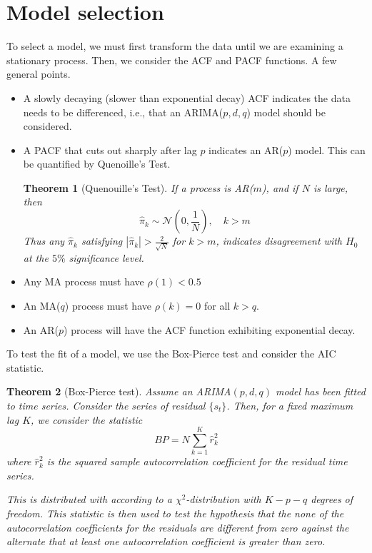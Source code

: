 \documentclass[10pt, oneside, reqno]{amsart}
\theoremstyle{plain}%
\newtheorem{thm}{Theorem}[section]
\theoremstyle{definition}
\theoremstyle{remark}
\newcommand{\ts}[1]{\{ #1 \}}
\begin{document}
\section{Model selection} %
\label{sec:model_selection}
	To select a model, we must first transform the data until we are examining a stationary process. 
	Then, we consider the ACF and PACF functions.  A few general points.
	\begin{itemize}
		\item A slowly decaying (slower than exponential decay) ACF indicates the data needs to be differenced, i.e., that an ARIMA($p,d,q$) model should be considered.
		\item A PACF that cuts out sharply after lag $p$ indicates an AR($p$) model.  This can be quantified by Quenoille's Test.  \begin{thm}[Quenouille's Test]
			If a process is AR($m$), and if $N$ is large, then \[
				\hat \pi_k \sim \mathcal{N}(0, \frac{1}{N}), \quad k > m
			\]
		Thus any $\hat \pi_k$ satisfying $|\hat \pi_k| > \frac{2}{\sqrt{N}}$ for $k > m$, indicates disagreement with $H_0$ at the $5\%$ significance level.
		\end{thm}
		\item Any MA process must have $\rho(1) < 0.5$
		\item An MA($q$) process must have $\rho(k) = 0$ for all $k > q$.
		\item An AR($p$) process will have the ACF function exhibiting exponential decay.
		\end{itemize}

To test the fit of a model, we use the Box-Pierce test and consider the AIC statistic.

\begin{thm}[Box-Pierce test]
	Assume an ARIMA$(p,d,q)$ model has been fitted to time series.  Consider the series of residual $\ts{s_t}$.  Then, for a fixed maximum lag $K$, we consider the statistic \[
		BP = N \sum_{k = 1}^K \hat r_k^2	\] where $\hat r_k^2$ is the squared sample autocorrelation coefficient for the residual time series.

This is distributed with according to a $\chi^2$-distribution with $K - p - q$ degrees of freedom.  
This statistic is then used to test the hypothesis that the none of the autocorrelation coefficients for the residuals are different from zero against the alternate that at least one autocorrelation coefficient is greater than zero.
\end{thm} 
\end{document}
